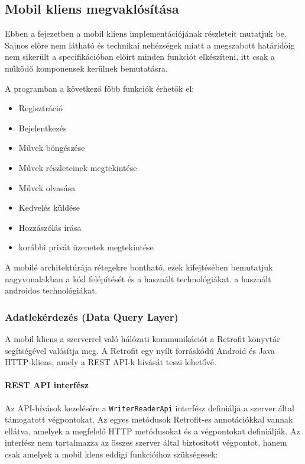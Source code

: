 \subsection{Mobil kliens megvaklósítása}
Ebben a fejezetben a mobil kliens implementációjának részleteit mutatjuk be. Sajnos előre nem látható és
technikai nehézségek miatt a megszabott határidőig nem sikerült a specifikációban előírt minden funkciót elkészíteni, 
itt csak a működő komponensek kerülnek bemutatásra.

A programban a következő főbb funkciók érhetők el: 
\begin{itemize}
    \item Regisztráció
    \item Bejelentkezés
    \item Művek böngészése
    \item Művek részleteinek megtekintése
    \item Művek olvasása
    \item Kedvelés küldése
    \item Hozzászólás írása
    \item korábbi privát üzenetek megtekintése
\end{itemize}

A mobilé architektúrája rétegekre bontható, ezek kifejtésében bemutatjuk nagyvonalakban a kód felépítését és a használt technológiákat.
 a használt androidos technológiákat.


\subsubsection{Adatlekérdezés (Data Query Layer)}
A mobil kliens a szerverrel való hálózati kommunikációt a Retrofit könyvtár segítségével valósítja meg.
A Retrofit egy nyílt forráskódú Android és Java HTTP-kliens, amely a REST API-k hívását teszi lehetővé.


\paragraph{REST API interfész}
Az API-hívások kezelésére a \texttt{WriterReaderApi} interfész definiálja a szerver által támogatott végpontokat. 
Az egyes metódusok Retrofit-es annotációkkal vannak ellátva, amelyek a megfelelő HTTP metódusokat és a végpontokat definiálják.
Az interfész nem tartalmazza az összes szerver által biztosított végpontot, hanem csak amelyek a mobil klens eddigi 
funkcióihoz szükségesek:

